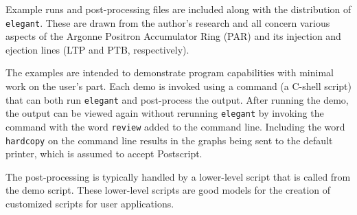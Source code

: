 \documentclass[11pt]{article}
\begin{document}
Example runs and post-processing files are included along with the
distribution of {\tt elegant}.  These are drawn from the author's
research and all concern various aspects of the Argonne Positron
Accumulator Ring (PAR) and its injection and ejection lines (LTP and
PTB, respectively).

The examples are intended to demonstrate program capabilities with
minimal work on the user's part.  Each demo is invoked using a command
(a C-shell script) that can both run {\tt elegant} and post-process
the output.  After running the demo, the output can be viewed again
without rerunning {\tt elegant} by invoking the command with the word
\verb|review| added to the command line.  Including the word
\verb|hardcopy| on the command line results in the graphs being sent
to the default printer, which is assumed to accept Postscript.

The post-processing is typically handled by a lower-level script that
is called from the demo script.  These lower-level scripts are good
models for the creation of customized scripts for user applications.
\end{document}
